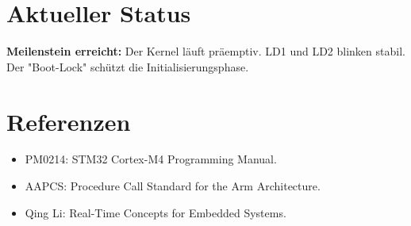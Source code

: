 \documentclass[11pt,a4paper]{article}
\begin{document}
\section{Aktueller Status}
\textbf{Meilenstein erreicht:} Der Kernel läuft präemptiv. LD1 und LD2 blinken stabil. Der "Boot-Lock" schützt die Initialisierungsphase.

\section{Referenzen}
\begin{itemize}
    \item PM0214: STM32 Cortex-M4 Programming Manual.
    \item AAPCS: Procedure Call Standard for the Arm Architecture.
    \item Qing Li: Real-Time Concepts for Embedded Systems.
\end{itemize}
\end{document}
